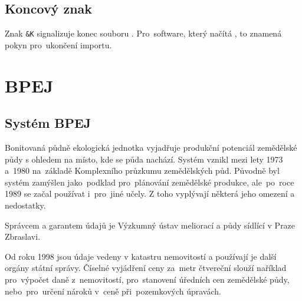 
\subsection{Koncový znak}
\label{koncovy_znak}

Znak \texttt{\&K} signalizuje konec souboru . Pro~software, který načítá , to znamená pokyn pro~ukončení importu.

\section{BPEJ}
\label{bpej}

\subsection{Systém BPEJ}
\label{system_bpej}

Bonitovaná půdně ekologická jednotka vyjadřuje produkční potenciál zemědělské půdy s ohledem na místo, kde se půda nachází. Systém  vznikl mezi lety 1973 a~1980 na~základě Komplexního průzkumu zemědělských půd. Původně byl systém  zamýšlen jako~podklad pro~plánování zemědělské produkce, ale~po~roce 1989 se začal používat i~pro~jiné učely. Z toho vyplývají některá jeho omezení a nedostatky.

Správcem a garantem údajů  je Výzkumný ústav meliorací a půdy sídlící v Praze Zbraslavi.

Od roku 1998 jsou údaje  vedeny v katastru nemovitostí a používají je další orgány státní správy. Číselné vyjádření ceny  za~metr čtvereční slouží naříklad pro~výpočet daně z~nemovitostí, pro~stanovení úředních cen zemědělské půdy, nebo~pro~určení nároků v~ceně při~pozemkových úpravách.

